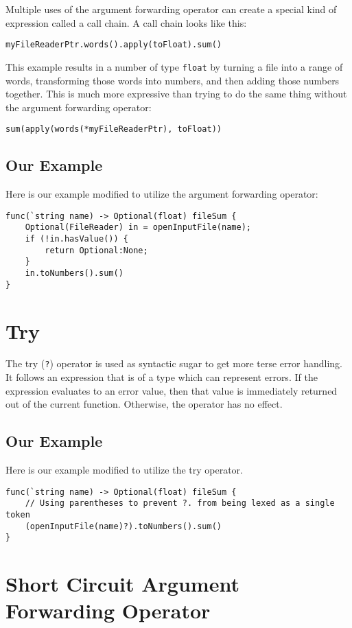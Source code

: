 \documentclass{article}
\begin{document}
	Multiple uses of the argument forwarding operator can create a special kind of expression
	called a call chain.
	A call chain looks like this:

	\verb|myFileReaderPtr.words().apply(toFloat).sum()|

	This example results in a number of type \verb|float| by turning a file into a range of
	words, transforming those words into numbers, and then adding those numbers together.
	This is much more expressive than trying to do the same thing without the argument forwarding
	operator:

	\verb|sum(apply(words(*myFileReaderPtr), toFloat))|

	\subsection{Our Example}

	Here is our example modified to utilize the argument forwarding operator:

	\begin{lstlisting}
func(`string name) -> Optional(float) fileSum {
	Optional(FileReader) in = openInputFile(name);
	if (!in.hasValue()) {
		return Optional:None;
	}
	in.toNumbers().sum()
}
	\end{lstlisting}

	\section{Try}

	The try (\verb|?|) operator is used as syntactic sugar to get more terse error handling.
	It follows an expression that is of a type which can represent errors.
	If the expression evaluates to an error value, then that value is immediately returned out of
	the current function.
	Otherwise, the operator has no effect.

	\subsection{Our Example}

	Here is our example modified to utilize the try operator.

	\begin{lstlisting}
func(`string name) -> Optional(float) fileSum {
	// Using parentheses to prevent ?. from being lexed as a single token
	(openInputFile(name)?).toNumbers().sum()
}
	\end{lstlisting}

	\section{Short Circuit Argument Forwarding Operator}
\end{document}

